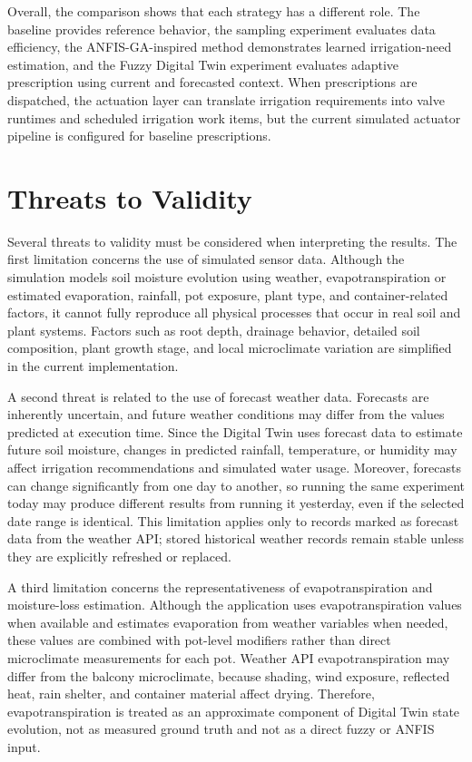 \par Overall, the comparison shows that each strategy has a different role. The baseline
    provides reference behavior, the sampling experiment evaluates data efficiency, the
    ANFIS-GA-inspired method demonstrates learned irrigation-need estimation, and the
    Fuzzy Digital Twin experiment evaluates adaptive prescription using current and
    forecasted context. When prescriptions are dispatched, the actuation layer can
    translate irrigation requirements into valve runtimes and scheduled irrigation work
    items, but the current simulated actuator pipeline is configured for baseline
    prescriptions.

\section{Threats to Validity}
\label{sec:ch4sec6}

\par Several threats to validity must be considered when interpreting the results. The
    first limitation concerns the use of simulated sensor data. Although the simulation
    models soil moisture evolution using weather, evapotranspiration or estimated
    evaporation, rainfall, pot exposure, plant type, and container-related factors, it
    cannot fully reproduce all physical processes that occur in real soil and plant
    systems. Factors such as root depth, drainage behavior, detailed soil composition,
    plant growth stage, and local microclimate variation are simplified in the current
    implementation.

\par A second threat is related to the use of forecast weather data. Forecasts are
    inherently uncertain, and future weather conditions may differ from the values
    predicted at execution time. Since the Digital Twin uses forecast data to estimate
    future soil moisture, changes in predicted rainfall, temperature, or humidity may
    affect irrigation recommendations and simulated water usage. Moreover, forecasts can
    change significantly from one day to another, so running the same experiment today may
    produce different results from running it yesterday, even if the selected date range
    is identical. This limitation applies only to records marked as forecast data from the
    weather API; stored historical weather records remain stable unless they are
    explicitly refreshed or replaced.

\par A third limitation concerns the representativeness of evapotranspiration and
    moisture-loss estimation. Although the application uses evapotranspiration values when
    available and estimates evaporation from weather variables when needed, these values
    are combined with pot-level modifiers rather than direct microclimate measurements for
    each pot. Weather API evapotranspiration may differ from the balcony microclimate,
    because shading, wind exposure, reflected heat, rain shelter, and container material
    affect drying. Therefore, evapotranspiration is treated as an approximate component of
    Digital Twin state evolution, not as measured ground truth and not as a direct fuzzy
    or ANFIS input.

